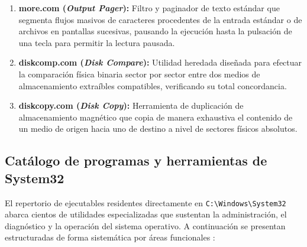 \documentclass[12pt]{article}
\begin{document}
\begin{enumerate}[leftmargin=*]
    \item \textbf{more.com (\textit{Output Pager}):} Filtro y paginador de texto estándar que segmenta flujos masivos de caracteres procedentes de la entrada estándar o de archivos en pantallas sucesivas, pausando la ejecución hasta la pulsación de una tecla para permitir la lectura pausada.
    
    \item \textbf{diskcomp.com (\textit{Disk Compare}):} Utilidad heredada diseñada para efectuar la comparación física binaria sector por sector entre dos medios de almacenamiento extraíbles compatibles, verificando su total concordancia.
    
    \item \textbf{diskcopy.com (\textit{Disk Copy}):} Herramienta de duplicación de almacenamiento magnético que copia de manera exhaustiva el contenido de un medio de origen hacia uno de destino a nivel de sectores físicos absolutos.
\end{enumerate}

\subsection{Catálogo de programas y herramientas de System32}\label{sec:catalogoProgramasSystem32}

El repertorio de ejecutables residentes directamente en \texttt{C:\textbackslash Windows\textbackslash System32} abarca cientos de utilidades especializadas que sustentan la administración, el diagnóstico y la operación del sistema operativo. A continuación se presentan estructuradas de forma sistemática por áreas funcionales \parencite{microsoftCommands}:
\end{document}
